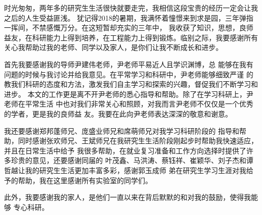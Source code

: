 \begin{thanks}
时光匆匆，两年多的研究生生活很快就要走完，我相信这段宝贵的经历一定会让我之后的人生受益匪浅。
犹记得2018的暑期，我满怀着憧憬来到求是园，三年弹指一挥间，不禁感慨万分。在这短暂却充实的三年中，
我收获了知识，思想，良师益友，在科研能力上得到培养，在工程能力上得到锻炼。临别之际，我要感谢所有
关心我帮助过我的老师、同学以及家人，是你们让我不断成长和进步。

首先我要感谢我的导师尹建伟老师，尹老师平易近人且学识渊博，总
能够在我有问题的时候与我讨论并给我意见。在平常学习和科研中，尹老师能够细致严谨
的教我们科研的态度和方法，激发我们自主学习和探索的兴趣，督促我们不断学习和进步。
本文的工作更是离不开尹老师的悉心指导和帮助。除了在学习科研上，尹老师在平常生活
中也对我们非常关心和照顾，对我而言尹老师不仅仅是一个优秀的学者，更是我的良师益
友。我要在此向尹老师表达深深的敬意和谢意。

我还要感谢郑邦蓬师兄、庞盛业师兄和席萌师兄对我学习科研阶段的
指导和帮助，同时感谢张欢师兄、王斌师兄在我研究生生活阶段刚起步时帮助我快速适应，并且在日常生活中给予
我很多帮助，在就业复习准备和工作方向选择时提供了许多珍贵的意见，还要感谢同届的
叶茂鑫、马洪涛、蔡钰祥、崔颖华、刘子杰和谭哲越让我的研究生生活更加丰富多彩，感谢郭玉成师
弟在研究生学习生涯对我给予的帮助，我在这里感谢所有实验室的同学们。

此外，我要感谢我的家人，是他们一直以来在背后默默的和对我的鼓励，使得我能够
专心科研。

\begin{flushright}
{}

\end{flushright}

\end{thanks}
